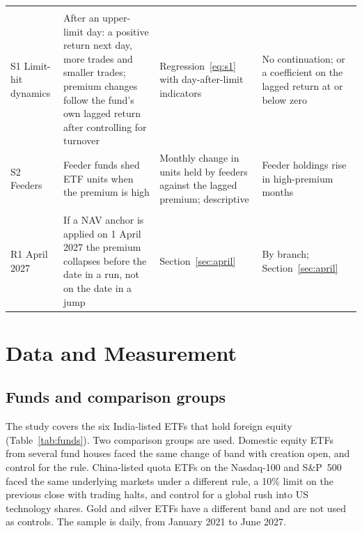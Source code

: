 \begin{table}[!t]
\begin{tabularx}{\textwidth}{L{1.55cm}L{3.9cm}YL{3.9cm}}
\addlinespace
{}\\
S1 Limit-hit dynamics & After an upper-limit day: a positive return next day, more trades and smaller trades; premium changes follow the fund's own lagged return after controlling for turnover & Regression~\eqref{eq:s1} with day-after-limit indicators & No continuation; or a coefficient on the lagged return at or below zero\\
S2 Feeders & Feeder funds shed ETF units when the premium is high & Monthly change in units held by feeders against the lagged premium; descriptive & Feeder holdings rise in high-premium months\\
\addlinespace
{}\\
R1 April 2027 & If a NAV anchor is applied on 1 April 2027 the premium collapses before the date in a run, not on the date in a jump & Section~\ref{sec:april} & By branch; Section~\ref{sec:april}\\
\bottomrule
\end{tabularx}
\end{table}

\section{Data and Measurement}\label{sec:data}
\subsection{Funds and comparison groups}
The study covers the six India-listed ETFs that hold foreign equity (Table~\ref{tab:funds}). Two comparison groups are used. Domestic equity ETFs from several fund houses faced the same change of band with creation open, and control for the rule. China-listed quota ETFs on the Nasdaq-100 and S\&P~500 faced the same underlying markets under a different rule, a 10\% limit on the previous close with trading halts, and control for a global rush into US technology shares. Gold and silver ETFs have a different band and are not used as controls. The sample is daily, from January 2021 to June 2027.

